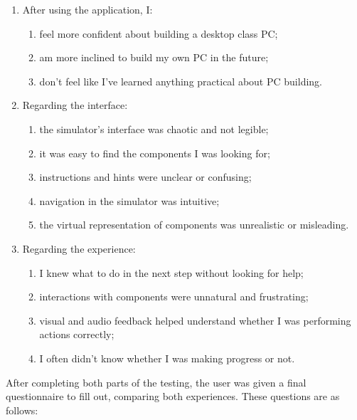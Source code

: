 \begin{enumerate}
    \item After using the application, I:
    \begin{enumerate}
        \item feel more confident about building a desktop class PC;
        \item am more inclined to build my own PC in the future;
        \item don't feel like I've learned anything practical about PC building.
    \end{enumerate}
    \item Regarding the interface:
    \begin{enumerate}
        \item the simulator's interface was chaotic and not legible;
        \item it was easy to find the components I was looking for;
        \item instructions and hints were unclear or confusing;
        \item navigation in the simulator was intuitive;
        \item the virtual representation of components was unrealistic or misleading.
    \end{enumerate}
    \item Regarding the experience:
    \begin{enumerate}
        \item I knew what to do in the next step without looking for help;
        \item interactions with components were unnatural and frustrating;
        \item visual and audio feedback helped understand whether I was performing actions correctly;
        \item I often didn't know whether I was making progress or not.
    \end{enumerate}
\end{enumerate}

After completing both parts of the testing, the user was given a final questionnaire to fill out, comparing both experiences.
These questions are as follows:

